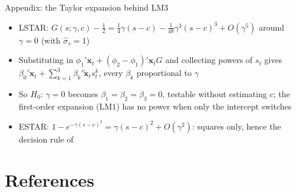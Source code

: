 \begin{frame}{Appendix: the Taylor expansion behind LM3}
\hypertarget{atsapp3}{}
\itemsize{\small}
\begin{itemize}
    \item LSTAR: $G(s; \gamma, c) - \tfrac12 = \tfrac14\gamma(s - c) - \tfrac{1}{48}\gamma^3(s - c)^3 + O(\gamma^5)$ around $\gamma = 0$ (with $\hat\sigma_s = 1$)
    \item Substituting in $\phi_1'\mathbf x_t + (\phi_2 - \phi_1)'\mathbf x_t G$ and collecting powers of $s_t$ gives $\beta_0'\mathbf x_t + \sum_{k=1}^3\beta_k'\tilde{\mathbf x}_t s_t^k$, every $\beta_k$ proportional to $\gamma$
    \item So $H_0$: $\gamma = 0$ becomes $\beta_1 = \beta_2 = \beta_3 = 0$, testable without estimating $c$; the first-order expansion (LM1) has no power when only the intercept switches 
    \item ESTAR: $1 - e^{-\gamma(s - c)^2} = \gamma(s - c)^2 + O(\gamma^2)$: squares only, hence the decision rule of 
\end{itemize}
\end{frame}


\section{References}

